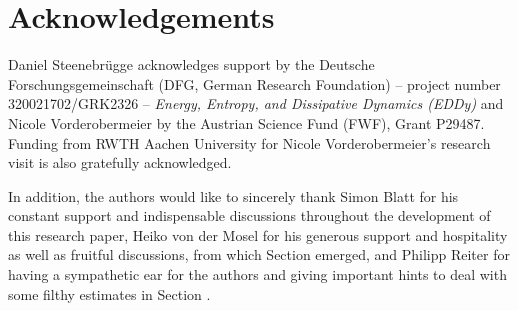 \section*{Acknowledgements}

Daniel Steenebrügge acknowledges support by the Deutsche Forschungsgemeinschaft (DFG, German Research Foundation) – project number 320021702/GRK2326 –  \emph{Energy, Entropy, and Dissipative Dynamics (EDDy)} and Nicole Vorderobermeier by the Austrian Science Fund (FWF), Grant P29487. Funding from RWTH Aachen University for Nicole Vorderobermeier's research visit is also gratefully acknowledged.

In addition, the authors would like to sincerely thank Simon Blatt for his constant support and indispensable discussions throughout the development of this research paper, Heiko von der Mosel for his generous support and hospitality as well as fruitful discussions, from which Section  emerged, and Philipp Reiter for having a sympathetic ear for the authors and giving important hints to deal with some filthy estimates in Section .
